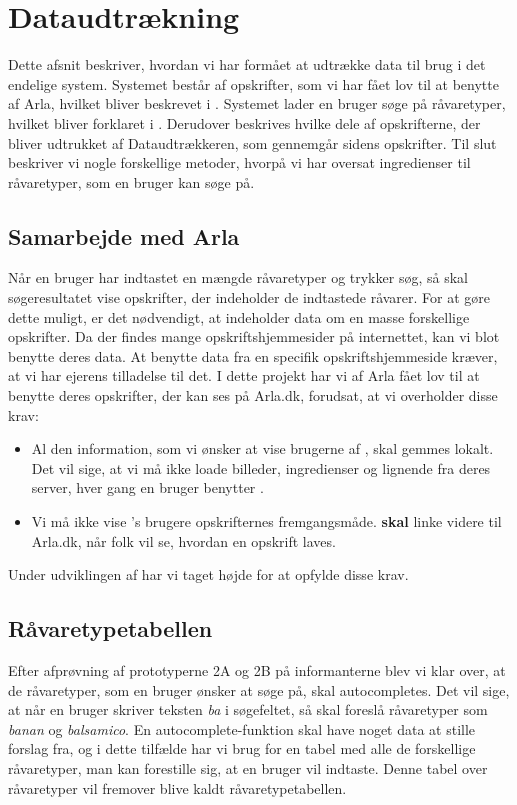 \section{Dataudtrækning}
Dette afsnit beskriver, hvordan vi har formået at udtrække data til brug i det endelige system. Systemet består af opskrifter, som vi har fået lov til at benytte af Arla, hvilket bliver beskrevet i . Systemet lader en bruger søge på råvaretyper, hvilket bliver forklaret i . Derudover beskrives hvilke dele af opskrifterne, der bliver udtrukket af Dataudtrækkeren, som gennemgår sidens opskrifter. Til slut beskriver vi nogle forskellige metoder, hvorpå vi har oversat ingredienser til råvaretyper, som en bruger kan søge på.

\subsection{Samarbejde med Arla}
Når en bruger har indtastet en mængde råvaretyper og trykker søg, så skal søgeresultatet vise opskrifter, der indeholder de indtastede råvarer. For at gøre dette muligt, er det nødvendigt, at \Foodl{} indeholder data om en masse forskellige opskrifter. Da der findes mange opskriftshjemmesider på internettet, kan vi blot benytte deres data. At benytte data fra en specifik opskriftshjemmeside kræver, at vi har ejerens tilladelse til det. I dette projekt har vi af Arla fået lov til at benytte deres opskrifter, der kan ses på Arla.dk, forudsat, at vi overholder disse krav:

\begin{itemize} [noitemsep]
  \item Al den information, som vi ønsker at vise brugerne af \Foodl, skal gemmes lokalt. Det vil sige, at vi må ikke loade billeder, ingredienser og lignende fra deres server, hver gang en bruger benytter \Foodl.
  \item Vi må ikke vise \Foodl{}'s brugere opskrifternes fremgangsmåde. \Foodl{} \textbf{skal} linke videre til Arla.dk, når folk vil se, hvordan en opskrift laves.
\end{itemize}
Under udviklingen af \Foodl{} har vi taget højde for at opfylde disse krav.

\subsection{Råvaretypetabellen}
Efter afprøvning af prototyperne 2A og 2B på informanterne blev vi klar over, at de råvaretyper, som en bruger ønsker at søge på, skal autocompletes. Det vil sige, at når en bruger skriver teksten \textit{ba} i søgefeltet, så skal \Foodl{} foreslå råvaretyper som \fx \textit{banan} og \textit{balsamico}.
En autocomplete-funktion skal have noget data at stille forslag fra, og i dette tilfælde har vi brug for en tabel med alle de forskellige råvaretyper, man kan forestille sig, at en bruger vil indtaste. Denne tabel over råvaretyper vil fremover blive kaldt råvaretypetabellen.

